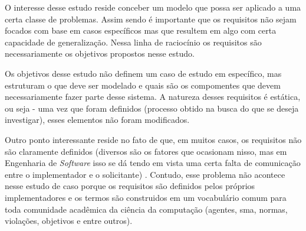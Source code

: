 O interesse desse estudo reside conceber um modelo que possa ser aplicado a uma certa classe de problemas. Assim sendo é importante que os requisitos não sejam focados com base em casos específicos mas que resultem em algo com certa capacidade de generalização. Nessa linha de raciocínio os requisitos são necessariamente os objetivos propostos nesse estudo. 

Os objetivos desse estudo não definem um caso de estudo em específico, mas estruturam o que deve ser modelado e quais são os compomentes que devem necessariamente fazer parte desse sistema. A natureza desses requisitos é estática, ou seja - uma vez que foram definidos (processo obtido na busca do que se deseja investigar), esses elementos não foram modificados. 

Outro ponto interessante reside no fato de que, em muitos casos, os requisitos não são claramente definidos (diversos são os fatores que ocasionam nisso, mas em Engenharia de \textit{Software} isso se dá tendo em vista uma certa falta de comunicação entre o implementador e o solicitante) \cite{softwareeng}. Contudo, esse problema não acontece nesse estudo de caso porque os requisitos são definidos pelos próprios implementadores e os termos são construidos em um vocabulário comum para toda comunidade acadêmica da ciência da computação (agentes, sma, normas, violações, objetivos e entre outros). 
